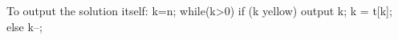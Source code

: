 \documentclass[openany]{article}
\begin{document}
To output the solution itself:
k=n; while(k>0) if (k yellow) {output k; k = t[k];} else k--;


        

\end{document}
